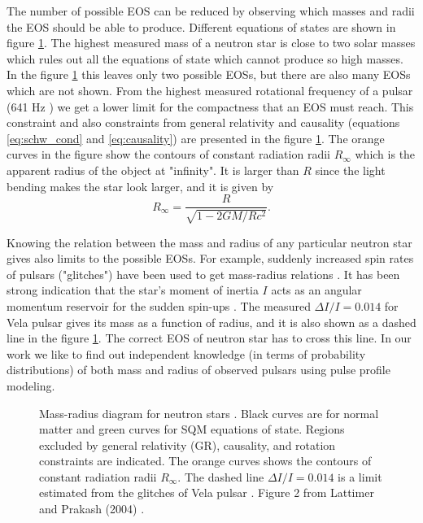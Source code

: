 \documentclass{wihuri}
\def\be{\begin{equation}}
\def\ee{\end{equation}}
\begin{document}
The number of possible EOS can be reduced by observing which masses and radii the EOS should be able to produce. Different equations of states are shown in figure \ref{fig:eos_mr}. The highest measured mass of a neutron star is close to two solar masses \cite{demorest} which rules out all the equations of state which cannot produce so high masses. In the figure \ref{fig:eos_mr} this leaves only two possible EOSs, but there are also many EOSs which are not shown. From the highest measured rotational frequency of a pulsar (641 Hz \cite{lattimer}) we get a lower limit for the compactness that an EOS must reach. This constraint and also constraints from general relativity and causality (equations \ref{eq:schw_cond} and \ref{eq:causality}) are presented in the figure \ref{fig:eos_mr}. The orange curves in the figure show the contours of constant radiation radii $R_{\infty}$ which is the apparent radius of the object at "infinity". It is larger than $R$ since the light bending makes the star look larger, and it is given by \cite{lattimer2001}
\be \label{eq:rinfty}
R_{\infty} = \frac{R}{\sqrt{1-2GM/Rc^{2}}}.
\ee  

Knowing the relation between the mass and radius of any particular neutron star gives also limits to the possible EOSs. For example, suddenly increased spin rates of pulsars ("glitches") have been used to get mass-radius relations \cite{lattimer2001}. It has been strong indication that the star's moment of inertia $I$ acts as an angular momentum reservoir for the sudden spin-ups \cite{link1999}. The measured $\Delta I / I = 0.014$  for Vela pulsar gives its mass as a function of radius, and it is also shown as a dashed line in the figure \ref{fig:eos_mr}. The correct EOS of neutron star has to cross this line. In our work we like to find out independent knowledge (in terms of probability distributions) of both mass and radius of observed pulsars using pulse profile modeling. 




 
\begin{figure}
\centerline{} 
\caption{Mass-radius diagram for neutron stars \cite{lattimer}. Black curves are for normal matter and green curves for SQM equations of state. Regions excluded by general relativity (GR), causality, and rotation constraints are indicated. The orange curves shows the contours of constant radiation radii $R_{\infty}$. The dashed line $\Delta I / I = 0.014$ is a limit estimated from the glitches of Vela pulsar \cite{lattimer2001}. Figure 2 from Lattimer and Prakash (2004) \cite{lattimer}.}  
\label{fig:eos_mr}
\end{figure}
\end{document}
